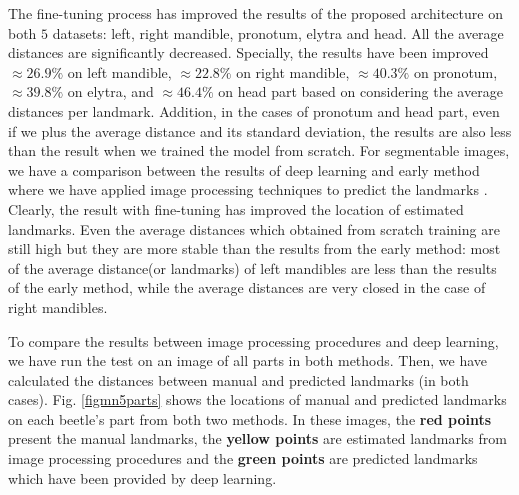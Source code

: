 \documentclass[review]{elsarticle}
\begin{document}
The fine-tuning process has improved the results of the proposed architecture on both $5$ datasets: left, right mandible, pronotum, elytra and head. All the average distances are significantly decreased. Specially, the results have been improved $\approx 26.9\%$ on left mandible, $\approx 22.8\%$ on right mandible, $\approx 40.3\%$ on pronotum, $\approx 39.8\%$ on elytra, and $\approx 46.4\%$  on head part based on considering the average distances per landmark. Addition, in the cases of pronotum and head part, even if we plus the average distance and its standard deviation, the results are also less than the result when we trained the model from scratch. For segmentable images, we have a comparison between the results of deep learning and early method where we have applied image processing techniques to predict the landmarks \cite{le2017maelab}. Clearly, the result with fine-tuning has improved the location of estimated landmarks. Even the average distances which obtained from scratch training are still high but they are more stable than the results from the early method: most of the average distance(or landmarks) of left mandibles are less than the results of the early method, while the average distances are very closed in the case of right mandibles.

To compare the results between image processing procedures and deep learning, we have run the test on an image of all parts in both methods. Then, we have calculated the distances between manual and predicted landmarks (in both cases). Fig. \ref{figmn5parts} shows the locations of manual and predicted landmarks on each beetle's part from both two methods. In these images, the \textbf{red points} present the manual landmarks, the \textbf{yellow points} are estimated landmarks from image processing procedures and the \textbf{green points} are predicted landmarks which have been provided by deep learning.
\end{document}
